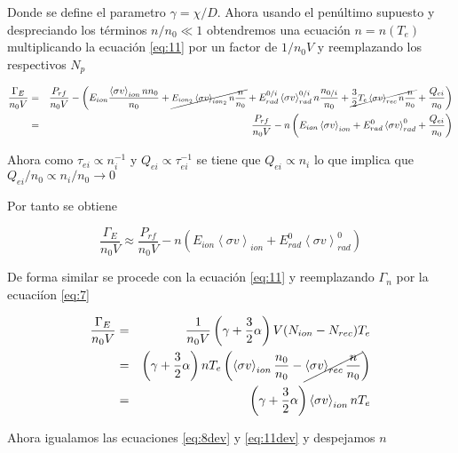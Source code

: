\documentclass[11pt]{article}
\theoremstyle{definition}
\begin{document}
  Donde se define el parametro $\gamma = \chi/D$. Ahora usando el pen\'ultimo supuesto y despreciando los t\'erminos $n/n_0 \ll 1$ obtendremos una ecuaci\'on $n = n(T_e)$ multiplicando la ecuaci\'on \eqref{eq:11} por un factor de $1/n_0 V$ y reemplazando los respectivos $N_p$

  \begin{eqnarray*}
    \frac{\Gamma_E}{n_0V} &=& \small{\frac{P_{rf}}{n_0V} - \left(E_{ion}\frac{\left<\sigma v\right>_{ion} nn_0 }{n_0 } +\cancel{E_{ion_2}\left<\sigma v\right>_{ion_2} n \frac{n}{n_0} } + E_{rad}^{0/i}\left<\sigma v\right>_{rad}^{0/i}n \frac{n_{0/i}}{n_0} + \cancel{\frac{3}{2}T_e\left<\sigma v\right>_{rec}n \frac{n}{n_0} } + \frac{Q_{ei}}{n_0} \right)} \nonumber\\
                          &=& \frac{P_{rf}}{n_0V} -n \left(E_{ion}\left<\sigma v\right>_{ion} + E_{rad}^0\left<\sigma v\right>_{rad}^0 + \frac{Q_{ei}}{n_0}\right) 
  \end{eqnarray*}

  Ahora como $\tau_{ei} \propto n_i^{-1}$ y $Q_{ei} \propto \tau_{ei}^{-1}$ se tiene que $Q_{ei} \propto n_i$ lo que implica que $Q_{ei}/n_0 \propto n_i/n_0 \rightarrow 0$
  
  Por tanto se obtiene
  
  \begin{equation}\label{eq:8dev}
    \frac{\Gamma_{E}}{n_0V} \approx \frac{P_{rf}}{n_0V} -n (E_{ion}\left<\sigma v\right>_{ion} + E_{rad}^0\left<\sigma v\right>_{rad}^0)
  \end{equation}

  De forma similar se procede con la ecuaci\'on \eqref{eq:11} y reemplazando $\Gamma_n$ por la ecuaci\'ion \eqref{eq:7}

  \begin{eqnarray}\label{eq:11dev}
    \frac{\Gamma_E}{n_0 V} &=& \frac{1}{n_0V} \left(\gamma + \frac{3}{2}\alpha\right)V(N_{ion} - N_{rec})T_e \nonumber\\
                           &=& \left(\gamma + \frac{3}{2}\alpha\right)nT_e \left(\left<\sigma v\right>_{ion}\frac{n_0}{n_0} - \cancel{\left<\sigma v\right>_{rec}\frac{n}{n_0}}\right) \nonumber \\
                           &=& \left(\gamma + \frac{3}{2}\alpha\right)\left<\sigma v\right>_{ion}nT_e
  \end{eqnarray}

  Ahora igualamos las ecuaciones \eqref{eq:8dev} y \eqref{eq:11dev} y despejamos $n$
\end{document}

